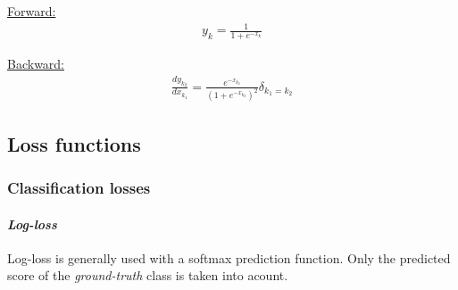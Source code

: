   \begin{center}
  \end{center}

\noindent
\underline{Forward:}
\begin{align}
 y_k = \frac{1}{1+e^{-x_k}} \nonumber
\end{align}

\noindent
\underline{Backward:}
\begin{align}
 \frac{dy_{k_2}}{dx_{k_1}} = \frac{e^{-x_{k_2}}}{(1+e^{-x_{k_2}})^2} \delta_{k_1=k_2} \nonumber
\end{align}






\subsection{Loss functions}


\subsubsection{Classification losses}

\paragraph{\textit{Log-loss}}
Log-loss is generally used with a softmax prediction function. Only the predicted score of the \textit{ground-truth} class is taken into acount. 

